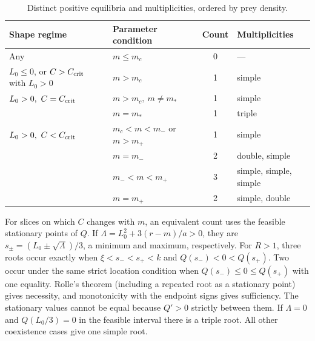\documentclass[12pt,a4paper,twoside,fleqn]{article}
\theoremstyle{journal}
\begin{document}
\begin{table}[H]\centering
\caption{Distinct positive equilibria and multiplicities, ordered by prey density.}
\label{tab:count}
\begin{tabularx}{\linewidth}{@{}lYcl@{}}\toprule
Shape regime & Parameter condition & Count & Multiplicities \\ \midrule
Any & \(m\le m_c\) & 0 & --- \\
\(L_0\le0\), or \(C>C_{\rm crit}\) with \(L_0>0\)
 & \(m>m_c\) & 1 & simple \\
\(L_0>0,\ C=C_{\rm crit}\) & \(m>m_c,\ m\ne m_*\) & 1 & simple \\
 & \(m=m_*\) & 1 & triple \\
\(L_0>0,\ C<C_{\rm crit}\) & \(m_c<m<m_-\) or \(m>m_+\) & 1 & simple \\
 & \(m=m_-\) & 2 & double, simple \\
 & \(m_-<m<m_+\) & 3 & simple, simple, simple \\
 & \(m=m_+\) & 2 & simple, double \\
\bottomrule
\end{tabularx}
\end{table}

For slices on which \(C\) changes with \(m\), an equivalent count uses the feasible stationary points of \(Q\). If \(\Lambda=L_0^2+3(r-m)/a>0\), they are \(s_\pm=(L_0\pm\sqrt\Lambda)/3\), a minimum and maximum, respectively. For \(R>1\), three roots occur exactly when \(\xi<s_-<s_+<k\) and \(Q(s_-)<0<Q(s_+)\). Two occur under the same strict location condition when \(Q(s_-)\le0\le Q(s_+)\) with one equality. Rolle's theorem (including a repeated root as a stationary point) gives necessity, and monotonicity with the endpoint signs gives sufficiency. The stationary values cannot be equal because \(Q'>0\) strictly between them. If \(\Lambda=0\) and \(Q(L_0/3)=0\) in the feasible interval there is a triple root. All other coexistence cases give one simple root.
\end{document}
